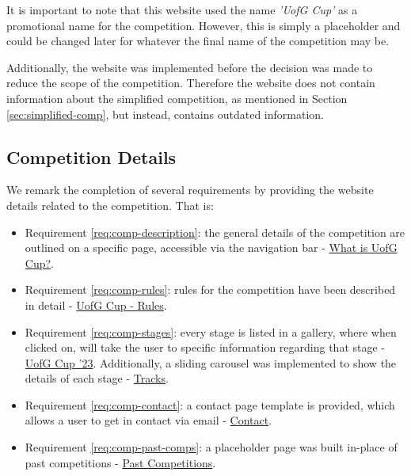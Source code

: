 \documentclass{l4proj}
\begin{document}
It is important to note that this website used the name \textit{'UofG Cup'} as a promotional name for the competition. However, this is simply a placeholder and could be changed later for whatever the final name of the competition may be. 

Additionally, the website was implemented before the decision was made to reduce the scope of the competition. Therefore the website does not contain information about the simplified competition, as mentioned in Section \ref{sec:simplified-comp}, but instead, contains outdated information.

\subsection{Competition Details}
We remark the completion of several requirements by providing the website details related to the competition. That is:

\begin{itemize}
    \item Requirement \ref{req:comp-description}: the general details of the competition are outlined on a specific page, accessible via the navigation bar - \href{https://robot-competition.github.io/robot-competition/what_is_uofg_cup.html}{What is UofG Cup?}.
    \item Requirement \ref{req:comp-rules}: rules for the competition have been described in detail - \href{https://robot-competition.github.io/robot-competition/rules.html}{UofG Cup - Rules}.
    \item Requirement \ref{req:comp-stages}: every stage is listed in a gallery, where when clicked on, will take the user to specific information regarding that stage - \href{https://robot-competition.github.io/robot-competition/uofg_cup_23.html}{UofG Cup '23}. Additionally, a sliding carousel was implemented to show the details of each stage - \href{https://robot-competition.github.io/robot-competition/tracks.html}{Tracks}.
    \item Requirement \ref{req:comp-contact}: a contact page template is provided, which allows a user to get in contact via email - \href{https://robot-competition.github.io/robot-competition/contact.html}{Contact}.
    \item Requirement \ref{req:comp-past-comps}: a placeholder page was built in-place of past competitions - \href{https://robot-competition.github.io/robot-competition/past_competitions.html}{Past Competitions}.
\end{itemize}
\end{document}
